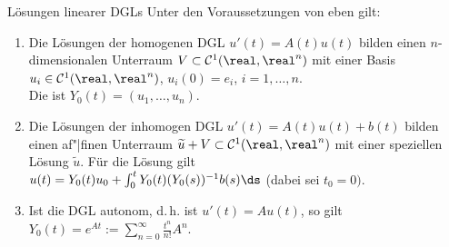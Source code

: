 \begin{Satz}{Lösungen linearer DGLs}
    Unter den Voraussetzungen von eben gilt:
    \begin{enumerate}
        \item
        Die Lösungen der homogenen DGL $u'(t) = A(t) u(t)$
        bilden einen $n$-dimensionalen Unterraum
        $V \subset \C^1(\real, \real^n)$ mit einer Basis
        $u_i \in \C^1(\real, \real^n)$, $u_i(0) = e_i$, $i = 1, \dotsc, n$.\\
        Die  ist
        $Y_0(t) = (u_1, \dotsc, u_n)$.

        \item
        Die Lösungen der inhomogen DGL $u'(t) = A(t) u(t) + b(t)$
        bilden einen af"|finen Unterraum
        $\widetilde{u} + V \subset \C^1(\real, \real^n)$
        mit einer speziellen Lösung $\widetilde{u}$.
        Für die Lösung gilt\\
        $u(t) = Y_0(t) u_0 + \int_0^t Y_0(t) (Y_0(s))^{-1} b(s) \ds$
        (dabei sei $t_0 = 0)$.

        \item
        Ist die DGL autonom, d.\,h. ist $u'(t) = A u(t)$, so gilt
        $Y_0(t) = e^{At} := \sum_{n=0}^\infty \frac{t^n}{n!} A^n$.
    \end{enumerate}
\end{Satz}

